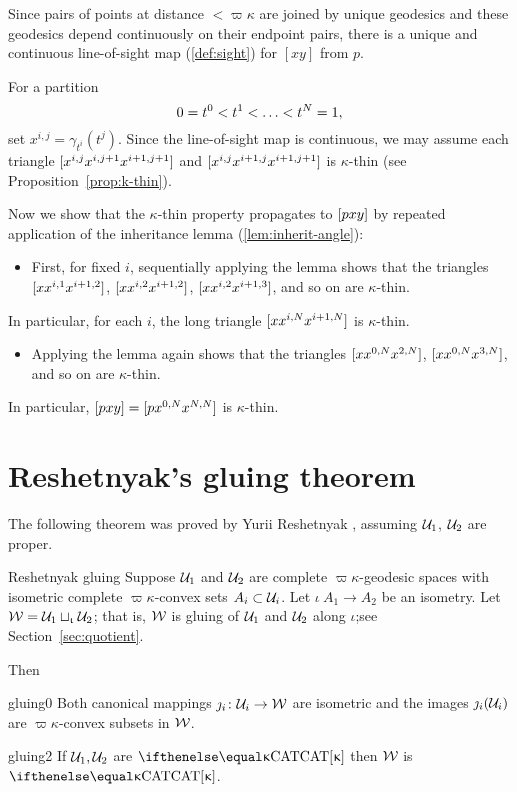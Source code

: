 Since pairs of points at distance $<\varpi\kappa$ are joined by unique geodesics and these geodesics depend continuously on their endpoint pairs, there is a unique and continuous line-of-sight map (\ref{def:sight}) for  $[x y]$ from $p$.    

For a partition \[0\z=t^0\z<t^1\z<\z\dots\z<t^N=1,\] 
set $x^{i,j}=\gamma_{t^i}(t^j)$. 
Since the line-of-sight map is continuous, we may assume each triangle $[{x^{i,j}}{x^{i,j+1}}{x^{i+1,j+1}}]$ and $[{x^{i,j}}{x^{i+1,j}}{x^{i+1,j+1}}]$ is $\kappa$-thin 
(see Proposition~\ref{prop:k-thin}).

Now we show that the $\kappa$-thin property propagates to $[{p}{x}{y}]$ by repeated application of the inheritance lemma (\ref{lem:inherit-angle}):
\begin{itemize}
\item 
First, for fixed $i$, 
sequentially applying the lemma shows  that the triangles 
$[{x}{x^{i,1}}{x^{i+1,2}}]$, 
$[{x}{x^{i,2}}{x^{i+1,2}}]$, 
$[{x}{x^{i,2}}{x^{i+1,3}}]$,
and so on are $\kappa$-thin. 
\end{itemize}
In particular, for each $i$, the long triangle $[{x}{x^{i,N}}{x^{i+1,N}}]$ is $\kappa$-thin.
\begin{itemize} 
\item 
Applying the lemma again shows that the  triangles $[{x}{x^{0,N}}{x^{2,N}}]$, $[{x}{x^{0,N}}{x^{3,N}}]$, and so on are $\kappa$-thin. 
\end{itemize}
In particular, $[{p}{x}{y}]=[{p}{x^{0,N}}{x^{N,N}}]$ is $\kappa$-thin.
\qeds

\section{Reshetnyak's gluing theorem}\label{sec:cba-gluing}

The following theorem was proved by Yurii Reshetnyak \cite{reshetnyak:glue}, assuming $\mathcal{U}_1$, $\mathcal{U}_2$ are proper.

\begin{thm}{Reshetnyak gluing}\label{thm:gluing}
Suppose 
$\mathcal{U}_1$ and $\mathcal{U}_2$ are complete $\varpi\kappa$-geodesic spaces 
with isometric complete $\varpi\kappa$-convex sets $A_i\subset\spc{U}_i$.  Let $\iota\:A_1\to A_2$ be an isometry.
Let $\mathcal{W}=\mathcal{U}_1\sqcup_{\upiota}\mathcal{U}_2$;
that is, $\mathcal{W}$ is gluing of $\mathcal{U}_1$ and  $\mathcal{U}_2$ along $\iota$;see Section~\ref{sec:quotient}.

Then 
\begin{subthm}{gluing0}
Both canonical mappings $\jmath_i\:\spc{U}_i\to\spc{W}$ are isometric 
and the images $\jmath_i(\mathcal{U}_i)$ are $\varpi\kappa$-convex subsets in $\mathcal{W}$.
\end{subthm}

\begin{subthm}{gluing2}
If $\mathcal{U}_1, \mathcal{U}_2$ are $\CAT\kappa$ 
then $\mathcal{W}$ is $\CAT\kappa$.
\end{subthm} 
\end{thm}

